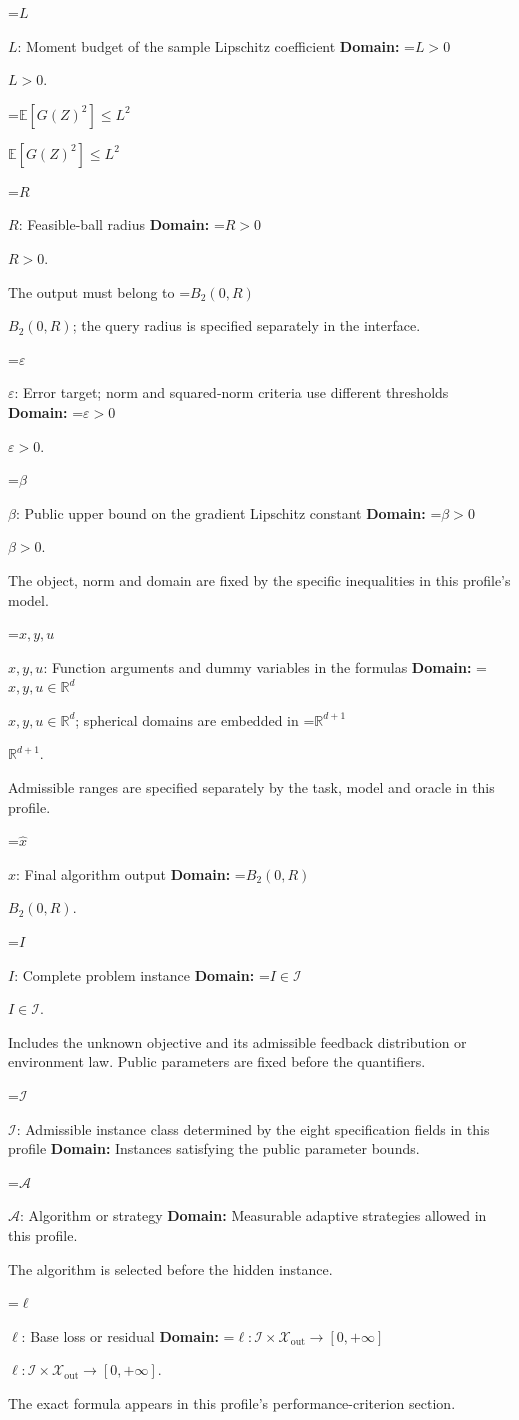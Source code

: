 \documentclass[10pt,a4paper]{article}
\newcommand{\AtlasMath}[1]{\par\begingroup\centering\setbox0=\hbox{$\displaystyle #1$}\ifdim\wd0>1.4\linewidth\typeout{ATLAS WIDE FORMULA: \the\wd0}\fi\ifdim\wd0>\linewidth\resizebox{\linewidth}{!}{\box0}\else\box0\fi\par\endgroup}
\newcommand{\AtlasInlineMath}[1]{\begingroup\setbox0=\hbox{$#1$}\ifdim\wd0>.4\linewidth\endgroup\AtlasMath{#1}\else\endgroup$#1$\fi}
\begin{document}
\AtlasInlineMath{L}: Moment budget of the sample Lipschitz coefficient \textbf{Domain:} \AtlasInlineMath{L>0}.

\AtlasInlineMath{\mathbb{E}[G(Z)^2]\le L^2}

\AtlasInlineMath{R}: Feasible-ball radius \textbf{Domain:} \AtlasInlineMath{R>0}.

The output must belong to \AtlasInlineMath{B_2(0,R)}; the query radius is specified separately in the interface.

\AtlasInlineMath{\varepsilon}: Error target; norm and squared-norm criteria use different thresholds \textbf{Domain:} \AtlasInlineMath{\varepsilon>0}.

\AtlasInlineMath{\beta}: Public upper bound on the gradient Lipschitz constant \textbf{Domain:} \AtlasInlineMath{\beta>0}.

The object, norm and domain are fixed by the specific inequalities in this profile's model.

\AtlasInlineMath{x,y,u}: Function arguments and dummy variables in the formulas \textbf{Domain:} \AtlasInlineMath{x,y,u\in\mathbb{R}^d}; spherical domains are embedded in \AtlasInlineMath{\mathbb{R}^{d+1}}.

Admissible ranges are specified separately by the task, model and oracle in this profile.

\AtlasInlineMath{\widehat{x}}: Final algorithm output \textbf{Domain:} \AtlasInlineMath{B_2(0,R)}.

\AtlasInlineMath{I}: Complete problem instance \textbf{Domain:} \AtlasInlineMath{I\in\mathcal{I}}.

Includes the unknown objective and its admissible feedback distribution or environment law. Public parameters are fixed before the quantifiers.

\AtlasInlineMath{\mathcal{I}}: Admissible instance class determined by the eight specification fields in this profile \textbf{Domain:} Instances satisfying the public parameter bounds.

\AtlasInlineMath{\mathcal{A}}: Algorithm or strategy \textbf{Domain:} Measurable adaptive strategies allowed in this profile.

The algorithm is selected before the hidden instance.

\AtlasInlineMath{\ell}: Base loss or residual \textbf{Domain:} \AtlasInlineMath{\ell:\mathcal{I}\times\mathcal{X}_{\mathrm{out}}\to[0,+\infty]}.

The exact formula appears in this profile's performance-criterion section.
\end{document}
